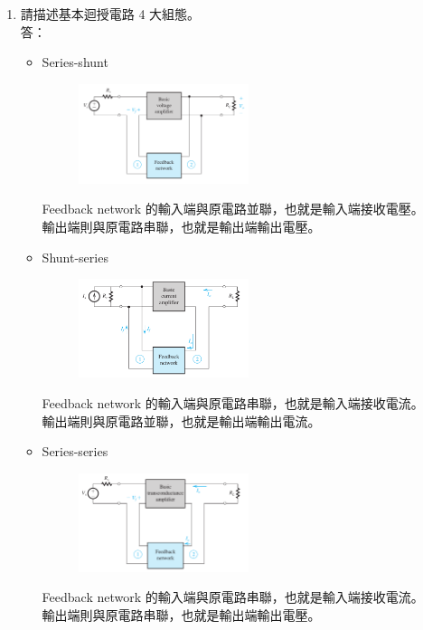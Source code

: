 \documentclass[12pt, a4paper]{article}
\begin{document}
\begin{enumerate}[itemsep=20pt, topsep=10pt]

  \item {請描述基本迴授電路 4 大組態。} \\[10pt]
    答：
    \begin{itemize}
      \item Series-shunt
        \begin{figure}[H]
          \centering
          \includegraphics[width=0.5\textwidth]{img/sesh.png}
        \end{figure}
        Feedback network 的輸入端與原電路並聯，也就是輸入端接收電壓。\\
        輸出端則與原電路串聯，也就是輸出端輸出電壓。

      \item Shunt-series
        \begin{figure}[H]
          \centering
          \includegraphics[width=0.5\textwidth]{img/shse.png}
        \end{figure}
        Feedback network 的輸入端與原電路串聯，也就是輸入端接收電流。\\
        輸出端則與原電路並聯，也就是輸出端輸出電流。

      \item Series-series
        \begin{figure}[H]
          \centering
          \includegraphics[width=0.5\textwidth]{img/sese.png}
        \end{figure}
        Feedback network 的輸入端與原電路串聯，也就是輸入端接收電流。\\
        輸出端則與原電路串聯，也就是輸出端輸出電壓。


\end{itemize}
\end{enumerate}
\end{document}
